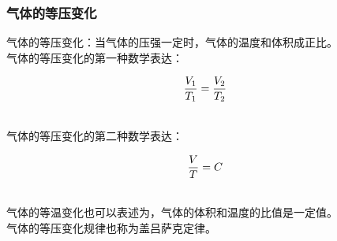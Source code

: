 \documentclass[UTF8]{ctexart}
\begin{document}
\subsubsection{气体的等压变化}
    气体的等压变化：当气体的压强一定时，气体的温度和体积成正比。\\[3mm]
    气体的等压变化的第一种数学表达：
    \begin{large}
        \begin{equation*}
            \frac{V_1}{T_1}=\frac{V_2}{T_2}\vspace{-3pt}
        \end{equation*}
    \end{large}\\
    气体的等压变化的第二种数学表达：
    \begin{large}
        \begin{equation*}
            \frac{V}{T}=C\vspace{-3pt}
        \end{equation*}
    \end{large}\\
    气体的等温变化也可以表述为，气体的体积和温度的比值是一定值。\\[3mm]
    气体的等压变化规律也称为盖吕萨克定律。

\newpage
\end{document}
